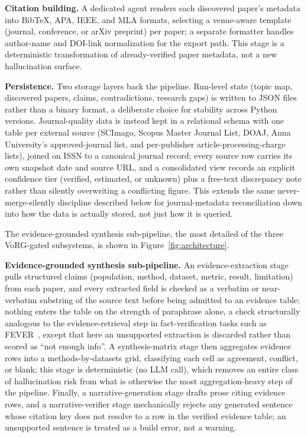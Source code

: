 \documentclass[11pt]{article}
\begin{document}
\textbf{Citation building.} A dedicated agent renders each discovered paper's metadata into BibTeX, APA, IEEE, and MLA formats, selecting a venue-aware template (journal, conference, or arXiv preprint) per paper; a separate formatter handles author-name and DOI-link normalization for the export path. This stage is a deterministic transformation of already-verified paper metadata, not a new hallucination surface.

\textbf{Persistence.} Two storage layers back the pipeline. Run-level state (topic map, discovered papers, claims, contradictions, research gaps) is written to JSON files rather than a binary format, a deliberate choice for stability across Python versions. Journal-quality data is instead kept in a relational schema with one table per external source (SCImago, Scopus Master Journal List, DOAJ, Anna University's approved-journal list, and per-publisher article-processing-charge lists), joined on ISSN to a canonical journal record; every source row carries its own snapshot date and source URL, and a consolidated view records an explicit confidence tier (verified, estimated, or unknown) plus a free-text discrepancy note rather than silently overwriting a conflicting figure. This extends the same never-merge-silently discipline described below for journal-metadata reconciliation down into how the data is actually stored, not just how it is queried.

The evidence-grounded synthesis sub-pipeline, the most detailed of the three VoRG-gated subsystems, is shown in Figure~\ref{fig:architecture}.

\textbf{Evidence-grounded synthesis sub-pipeline.} An evidence-extraction stage pulls structured claims (population, method, dataset, metric, result, limitation) from each paper, and every extracted field is checked as a verbatim or near-verbatim substring of the source text before being admitted to an evidence table; nothing enters the table on the strength of paraphrase alone, a check structurally analogous to the evidence-retrieval step in fact-verification tasks such as FEVER~\cite{thorne2018fever}, except that here an unsupported extraction is discarded rather than scored as ``not enough info''. A synthesis-matrix stage then aggregates evidence rows into a methods-by-datasets grid, classifying each cell as agreement, conflict, or blank; this stage is deterministic (no LLM call), which removes an entire class of hallucination risk from what is otherwise the most aggregation-heavy step of the pipeline. Finally, a narrative-generation stage drafts prose citing evidence rows, and a narrative-verifier stage mechanically rejects any generated sentence whose citation key does not resolve to a row in the verified evidence table; an unsupported sentence is treated as a build error, not a warning.
\end{document}
